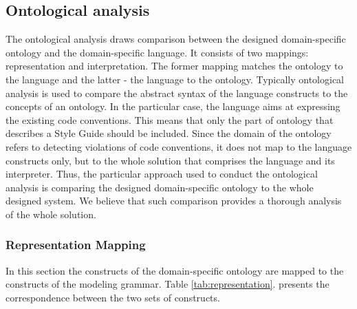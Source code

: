 \documentclass[parskip=full]{uvamscse}
\begin{document}
\subsection{Ontological analysis}

The ontological analysis draws comparison between the designed domain-specific ontology and the
domain-specific language. It consists of two mappings: representation and interpretation. The former
mapping matches the ontology to the language and the latter - the language to the ontology.
Typically ontological analysis is used to compare the abstract syntax of the language constructs to
the concepts of an ontology. In the particular case, the language aims at expressing the existing
code conventions. This means that only the part of ontology that describes a Style Guide should be
included. Since the domain of the ontology refers to detecting violations of code conventions, it
does not map to the language constructs only, but to the whole solution that comprises the language
and its interpreter. Thus, the particular approach used to conduct the ontological analysis is
comparing the designed domain-specific ontology to the whole designed system. We believe that such
comparison provides a thorough analysis of the whole solution.

\subsubsection{Representation Mapping} 

In this section the constructs of the domain-specific ontology are mapped to the constructs of the
modeling grammar. Table \ref{tab:representation}. presents the correspondence between the two sets
of constructs.
\end{document}
